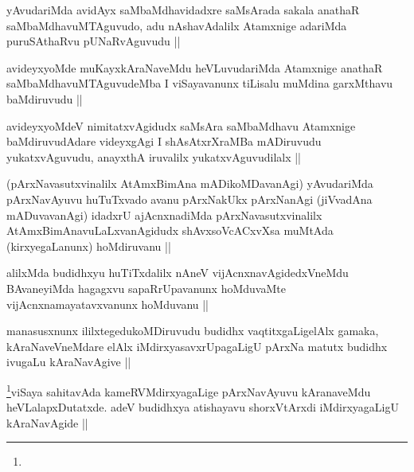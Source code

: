 
\begin{artha}
yAvudariMda avidAyx saMbaMdhavidadxre saMsArada sakala anathaR
saMbaMdhavuMTAguvudo, adu nAshavAdalilx Atamxnige adariMda
puruSAthaRvu pUNaRvAguvudu ||
\end{artha}

\begin{artha}
avideyxyoMde muKayxkAraNaveMdu heVLuvudariMda Atamxnige anathaR
saMbaMdhavuMTAguvudeMba I viSayavanunx tiLisalu muMdina garxMthavu
baMdiruvudu ||
\end{artha}


\begin{artha}
avideyxyoMdeV nimitatxvAgidudx saMsAra saMbaMdhavu Atamxnige
baMdiruvudAdare videyxgAgi I shAsAtxrXraMBa mADiruvudu yukatxvAguvudu,
anayxthA iruvalilx yukatxvAguvudilalx ||
\end{artha}


\begin{artha}
(pArxNavasutxvinalilx AtAmxBimAna mADikoMDavanAgi) yAvudariMda
  pArxNavAyuvu huTuTxvado avanu pArxNakUkx pArxNanAgi (jiVvadAna
  mADuvavanAgi) idadxrU ajAcnxnadiMda pArxNavasutxvinalilx
  AtAmxBimAnavuLaLxvanAgidudx shAvxsoVcACxvXsa muMtAda
  (kirxyegaLanunx) hoMdiruvanu ||
\end{artha}


\begin{artha}
alilxMda budidhxyu huTiTxdalilx nAneV vijAcnxnavAgidedxVneMdu
BAvaneyiMda hagagxvu sapaRrUpavanunx hoMduvaMte
vijAcnxnamayatavxvanunx hoMduvanu ||
\end{artha}

\begin{artha}
manasusxnunx ililxtegedukoMDiruvudu budidhx vaqtitxgaLigelAlx gamaka,
kAraNaveVneMdare elAlx iMdirxyasavxrUpagaLigU pArxNa matutx budidhx
ivugaLu kAraNavAgive ||
\end{artha}

\begin{artha}
\footnote{}viSaya sahitavAda kameRVMdirxyagaLige pArxNavAyuvu
kAranaveMdu heVLalapxDutatxde. adeV budidhxya atishayavu shorxVtArxdi
iMdirxyagaLigU kAraNavAgide ||
\end{artha}

